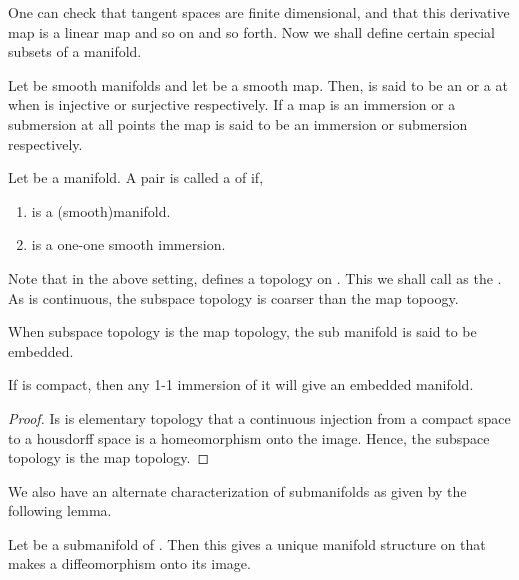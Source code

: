 \documentclass{article}
\begin{document}
One can check that tangent spaces are finite dimensional, and that this derivative map is a linear map and so on and so forth.
Now we shall define certain special subsets of a manifold.

\begin{definition}
    Let  be smooth manifolds and let  be a smooth map.
    Then, \mm{\phi} is said to be an  or a  at  when 
    is injective or surjective respectively. If a map is an immersion or a submersion at all points the map is said to be 
    an immersion or submersion respectively.
\end{definition}

\begin{definition}
    Let  be a manifold. A pair  is called a  of  if,
    \begin{enumerate}
        \item {} is a (smooth)manifold.
        \item {} is a one-one smooth immersion.
    \end{enumerate}
\end{definition}

Note that in the above setting,  defines a topology on . This we shall call as the .
As  is continuous, the subspace topology is coarser than the map topoogy.

\begin{definition}
    When subspace topology is the map topology, the sub manifold is said to be embedded.
\end{definition}

\begin{exercise*}
    If  is compact, then any 1-1 immersion of it will give an embedded manifold.
\end{exercise*}
\begin{proof}
    Is is elementary topology that a continuous injection from a compact space to a housdorff space is a homeomorphism onto the image.
    Hence, the subspace topology is the map topology.
\end{proof}

We also have an alternate characterization of submanifolds as given by the following lemma.

\begin{lemma}
    Let  be a submanifold of . Then this gives a unique manifold structure on  that makes 
    \mm{\phi} a diffeomorphism onto its image.
\end{lemma}
\end{document}
